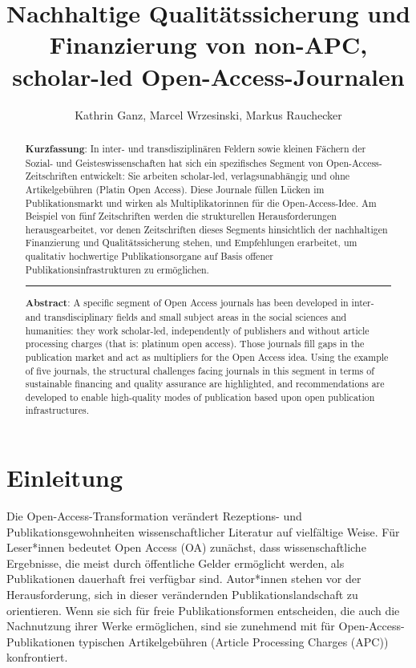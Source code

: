 \documentclass[a4paper,
fontsize=11pt,
oneside,
numbers=noperiodatend,
parskip=half-,
bibliography=totoc,
final
]{scrartcl}
\title{\LARGE{Nachhaltige Qualitätssicherung und Finanzierung von non-APC, scholar-led Open-Access-Journalen}} %
\author{Kathrin Ganz, Marcel Wrzesinski, Markus Rauchecker} %
\date{}
\begin{document}
\maketitle
\thispagestyle{fancyplain} 

\begin{abstract}
\noindent
\textbf{Kurzfassung}: In inter- und transdisziplinären Feldern sowie
kleinen Fächern der Sozial- und Geisteswissenschaften hat sich ein
spezifisches Segment von Open-Ac\-cess-Zeitschriften entwickelt: Sie
arbeiten scholar-led, verlagsunabhängig und ohne Artikelgebühren (Platin
Open Access). Diese Journale füllen Lücken im Publikationsmarkt und
wirken als Multiplikatorinnen für die Open-Access-Idee. Am Beispiel von
fünf Zeitschriften werden die strukturellen Herausforderungen
herausgearbeitet, vor denen Zeitschriften dieses Segments hinsichtlich
der nachhaltigen Finanzierung und Qualitätssicherung stehen, und
Empfehlungen erarbeitet, um qualitativ hochwertige Publikationsorgane
auf Basis offener Publikationsinfrastrukturen zu ermöglichen.

\begin{center}\rule{0.5\linewidth}{\linethickness}\end{center}

\noindent\textbf{Abstract}: A specific segment of Open Access journals has been
developed in inter- and transdisciplinary fields and small subject areas
in the social sciences and humanities: they work scholar-led,
independently of publishers and without article processing charges (that
is: platinum open access). Those journals fill gaps in the publication
market and act as multipliers for the Open Access idea. Using the
example of five journals, the structural challenges facing journals in
this segment in terms of sustainable financing and quality assurance are
highlighted, and recommendations are developed to enable high-quality
modes of publication based upon open publication infrastructures.
\end{abstract}

\hypertarget{einleitung}{%
\section*{Einleitung}\label{einleitung}}

Die Open-Access-Transformation verändert Rezeptions- und
Publikationsgewohnheiten wissenschaftlicher Literatur auf vielfältige
Weise. Für Leser*innen bedeutet Open Access (OA) zunächst, dass
wissenschaftliche Ergebnisse, die meist durch öffentliche Gelder
ermöglicht werden, als Publikationen dauerhaft frei verfügbar sind.
Autor*innen stehen vor der Herausforderung, sich in dieser verändernden
Publikationslandschaft zu orientieren. Wenn sie sich für freie
Publikationsformen entscheiden, die auch die Nachnutzung ihrer Werke
ermöglichen, sind sie zunehmend mit für Open-Access-Publikationen
typischen Artikelgebühren (Article Processing Charges (APC))
konfrontiert.
\end{document}

